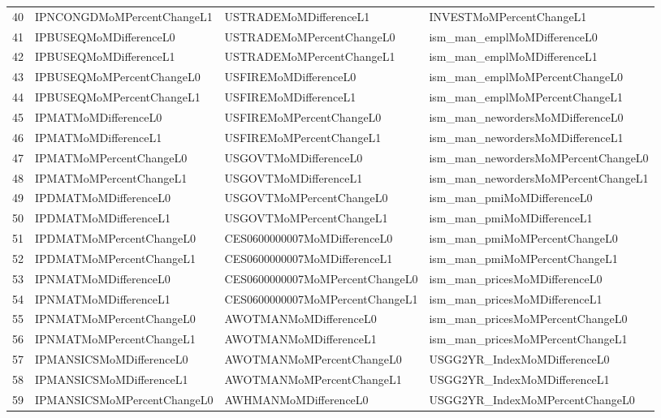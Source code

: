 \begin{longtable}{rlll}
  40 & IPNCONGDMoMPercentChangeL1 & USTRADEMoMDifferenceL1 & INVESTMoMPercentChangeL1 \\ 
  41 & IPBUSEQMoMDifferenceL0 & USTRADEMoMPercentChangeL0 & ism\_man\_emplMoMDifferenceL0 \\ 
  42 & IPBUSEQMoMDifferenceL1 & USTRADEMoMPercentChangeL1 & ism\_man\_emplMoMDifferenceL1 \\ 
  43 & IPBUSEQMoMPercentChangeL0 & USFIREMoMDifferenceL0 & ism\_man\_emplMoMPercentChangeL0 \\ 
  44 & IPBUSEQMoMPercentChangeL1 & USFIREMoMDifferenceL1 & ism\_man\_emplMoMPercentChangeL1 \\ 
  45 & IPMATMoMDifferenceL0 & USFIREMoMPercentChangeL0 & ism\_man\_newordersMoMDifferenceL0 \\ 
  46 & IPMATMoMDifferenceL1 & USFIREMoMPercentChangeL1 & ism\_man\_newordersMoMDifferenceL1 \\ 
  47 & IPMATMoMPercentChangeL0 & USGOVTMoMDifferenceL0 & ism\_man\_newordersMoMPercentChangeL0 \\ 
  48 & IPMATMoMPercentChangeL1 & USGOVTMoMDifferenceL1 & ism\_man\_newordersMoMPercentChangeL1 \\ 
  49 & IPDMATMoMDifferenceL0 & USGOVTMoMPercentChangeL0 & ism\_man\_pmiMoMDifferenceL0 \\ 
  50 & IPDMATMoMDifferenceL1 & USGOVTMoMPercentChangeL1 & ism\_man\_pmiMoMDifferenceL1 \\ 
  51 & IPDMATMoMPercentChangeL0 & CES0600000007MoMDifferenceL0 & ism\_man\_pmiMoMPercentChangeL0 \\ 
  52 & IPDMATMoMPercentChangeL1 & CES0600000007MoMDifferenceL1 & ism\_man\_pmiMoMPercentChangeL1 \\ 
  53 & IPNMATMoMDifferenceL0 & CES0600000007MoMPercentChangeL0 & ism\_man\_pricesMoMDifferenceL0 \\ 
  54 & IPNMATMoMDifferenceL1 & CES0600000007MoMPercentChangeL1 & ism\_man\_pricesMoMDifferenceL1 \\ 
  55 & IPNMATMoMPercentChangeL0 & AWOTMANMoMDifferenceL0 & ism\_man\_pricesMoMPercentChangeL0 \\ 
  56 & IPNMATMoMPercentChangeL1 & AWOTMANMoMDifferenceL1 & ism\_man\_pricesMoMPercentChangeL1 \\ 
  57 & IPMANSICSMoMDifferenceL0 & AWOTMANMoMPercentChangeL0 & USGG2YR\_IndexMoMDifferenceL0 \\ 
  58 & IPMANSICSMoMDifferenceL1 & AWOTMANMoMPercentChangeL1 & USGG2YR\_IndexMoMDifferenceL1 \\ 
  59 & IPMANSICSMoMPercentChangeL0 & AWHMANMoMDifferenceL0 & USGG2YR\_IndexMoMPercentChangeL0 \\ 

\end{longtable}
